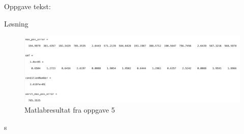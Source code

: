 % 

Oppgave tekst: 


\vspace{5mm}
Løsning

\begin{figure}[h]
    	
    \includegraphics[width=1.1\textwidth]{sections/Exercise5/AnswerTask5}
    \caption{Matlabresultat fra oppgave 5}
    \label{fig:AnswerTask5}
\end{figure}s

% 